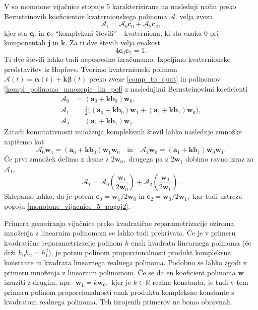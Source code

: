 \documentclass[12pt,a4paper,twoside]{article}
\theoremstyle{definition} %
\theoremstyle{plain} %
\theoremstyle{primerstyle}
\numberwithin{equation}{section}  %
\newcommand{\R}{\mathbb R}
\newcommand{\aV}{\mathbf{a}}
\newcommand{\bV}{\mathbf{b}}
\newcommand{\cV}{\mathbf{c}}
\newcommand{\jV}{\mathbf{j}}
\newcommand{\kV}{\mathbf{k}}
\newcommand{\wV}{\mathbf{w}}
\newcommand{\AQ}{\mathcal{A}}
\newcommand{\balpha}{\boldsymbol \alpha}
\newcommand{\bbeta}{\boldsymbol \beta}
\begin{document}
V \cite{faroukietal2004} so monotone vijačnice stopnje 5 karakterizirane na naslednji način preko Bernsteinovih koeficientov kvaternionskega polinoma $\AQ.$ velja zveza
\begin{equation}
	\label{monotone_vijacnice_5_pogoj}
	\AQ_1=\AQ_0\cV_0+\AQ_2\cV_2,
\end{equation}
kjer sta $\cV_0$ in $\cV_2$ ``kompleksni števili'' - kvaterniona, ki sta enaka 0 pri komponentah $\jV$ in $\kV.$ Za ti dve števili velja enakost
\begin{equation}
	\label{monotone_vijacnice_5_pogoj2}
	4\cV_0\cV_2=1.
\end{equation}
Ti dve števili lahko tudi neposredno izračunamo. Izpeljimo kvaternionsko predstavitev iz Hopfove. Tvorimo kvaternionski polinom $\AQ(t)=\balpha(t)+\kV\bbeta(t)$ preko zveze \eqref{comp_to_quat} in polinomov \eqref{kompl_polinoma_mnozenje_lin_pol} z naslednjimi Bernsteinovimi koeficienti
\begin{align*}
	\AQ_0&=(\aV_0+\kV\bV_0)\wV_0,\\
	\AQ_1&=\frac{1}{2}\big((\aV_0+\kV\bV_0)\wV_1+(\aV_1+\kV\bV_1)\wV_0\big),\\
	\AQ_2&=(\aV_1+\kV\bV_1)\wV_1.
\end{align*}
Zaradi komutativnosti množenja kompleksnih števil lahko naslednje zmnožke zapišemo kot
\begin{equation*}
	\AQ_0\wV_1=(\aV_0+\kV\bV_0)\wV_1\wV_0\quad\text{in}\quad\AQ_2\wV_0=(\aV_1+\kV\bV_1)\wV_0\wV_1.
\end{equation*}
Če prvi zmnožek delimo z desne z $2\wV_0,$ drugega pa z $2\wV_1$ dobimo ravno izraz za $\AQ_1,$
\begin{equation*}
	\AQ_1=\AQ_0\left(\frac{\wV_1}{2\wV_0}\right)+\AQ_2\left(\frac{\wV_0}{2\wV_1}\right).
\end{equation*}
Sklepamo lahko, da je potem $\cV_0=\wV_1/2\wV_0$ in $\cV_2=\wV_0/2\wV_1,$ kar tudi ustreza pogoju \eqref{monotone_vijacnice_5_pogoj2}.

Primera generiranja vijačnice preko kvadratične reparametrizacije oziroma množenja z linearnim polinomom se lahko tudi prekrivata. Če je v primeru kvadratične reparametrizacije polinom $h$ enak kvadratu linearnega polinoma (če drži $h_0h_2=h_1^2$), je potem polinom proporcionalnosti produkt kompleksne konstante in kvadrata linearnega realnega polinoma. Podobno se lahko zgodi v primeru množenja z linearnim polinomom. Če se da en koeficient polinoma $\wV$ izraziti z drugim, npr.\ $\wV_1=k\wV_0,$ kjer je $k\in\R$ realna konstanta, je tudi v tem primeru polinom proporcionalnosti enak produktu kompleksne konstante s kvadratom realnega polinoma. Teh izrojenih primerov ne bomo obravnali.
\end{document}
